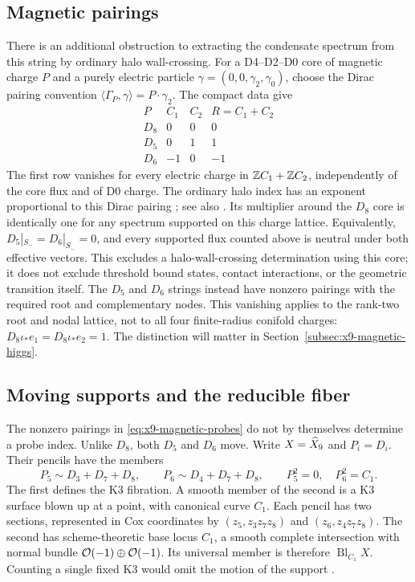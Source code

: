 \subsection{Magnetic pairings}
There is an additional obstruction to extracting the condensate spectrum
from this string by ordinary halo wall-crossing. For a D4--D2--D0 core
of magnetic charge $P$ and a purely electric particle
$\gamma=(0,0,\gamma_2,\gamma_0)$, choose the Dirac pairing convention
$\langle\Gamma_P,\gamma\rangle=P\cdot\gamma_2$. The compact data give
\begin{equation}
 \begin{array}{c|rrr}
 P&C_1&C_2&R=C_1+C_2\\\hline
 D_8&0&0&0\\
 D_5&0&1&1\\
 D_6&-1&0&-1
 \end{array}
 \label{eq:x9-magnetic-probes}
\end{equation}
The first row vanishes for every electric charge in
$\mathbb Z C_1+\mathbb Z C_2$, independently of the core flux and of D0 charge.
The ordinary halo index has an exponent proportional to this Dirac
pairing \cite{Denef:2007Halos}; see also
\cite[eqs.~(2.23)--(2.25)]{Manschot:2011Halos}. Its multiplier around the $D_8$
core is identically one for any spectrum supported on this charge
lattice. Equivalently, $D_5|_{S_-}=D_6|_{S_-}=0$, and every
supported flux counted above is neutral under both effective vectors.
This excludes a halo-wall-crossing determination using this core; it
does not exclude threshold bound states, contact interactions, or the
geometric transition itself. The $D_5$ and $D_6$ strings instead have
nonzero pairings with the required root and complementary nodes.
This vanishing applies to the rank-two root and nodal lattice,
not to all four finite-radius conifold charges: $D_8\iota_*e_1
=D_8\iota_*e_2=1$. The distinction will matter in
Section~\ref{subsec:x9-magnetic-higgs}.

\subsection{Moving supports and the reducible fiber}
\label{subsec:x9-moving-probes}

The nonzero pairings in \eqref{eq:x9-magnetic-probes} do not by themselves
determine a probe index. Unlike $D_8$, both $D_5$ and $D_6$ move.
Write $X=\widehat X_9$ and $P_i=D_i$. Their pencils have the members
\begin{equation}
 P_5\sim D_3+D_7+D_8,\qquad P_6\sim D_4+D_7+D_8,
 \qquad P_5^2=0,\quad P_6^2=C_1.
 \label{eq:x9-probe-pencils}
\end{equation}
The first defines the K3 fibration.
A smooth member of the second is a K3 surface blown up at a point,
with canonical curve $C_1$. Each pencil has two sections, represented
in Cox coordinates by $(z_5,z_3z_7z_8)$ and $(z_6,z_4z_7z_8)$.
The second has scheme-theoretic base locus $C_1$, a smooth complete
intersection with normal bundle $\mathcal O(-1)\oplus\mathcal O(-1)$.
Its universal member is therefore $\operatorname{Bl}_{C_1}X$.
Counting a single fixed K3 would omit the motion of the support
\cite[Section~2.2]{Bouchard:2017Vertical}.

